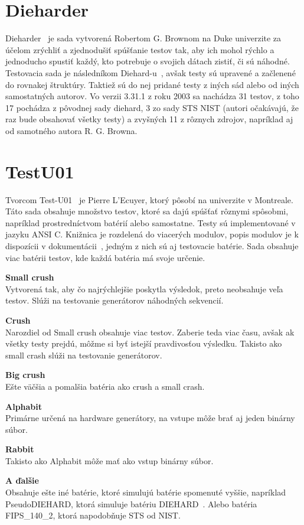 \section{Dieharder}
\label{sec:dieharder}
Dieharder~\parencite{dieharder} je sada vytvorená Robertom G. Brownom na Duke univerzite za účelom zrýchliť a zjednodušiť spúšťanie testov tak, aby ich mohol rýchlo a jednoducho spustiť každý, kto potrebuje o svojich dátach zistiť, či sú náhodné. Testovacia sada je následníkom Diehard-u~\parencite{diehard}, avšak testy sú upravené a začlenené do rovnakej štruktúry. Taktiež sú do nej pridané testy z iných sád alebo od iných samostatných autorov. Vo verzii 3.31.1 z roku 2003 sa nachádza 31 testov, z toho 17 pochádza z pôvodnej sady diehard, 3 zo sady STS NIST (autori očakávajú, že raz bude obsahovať všetky testy) a zvyšných 11 z rôznych zdrojov, napríklad aj od samotného autora R. G. Browna.

\section{TestU01}
\label{sec:testu01}
Tvorcom Test-U01~\parencite{testu01} je  Pierre L’Ecuyer, ktorý pôsobí na univerzite v Montreale. Táto sada obsahuje množstvo testov, ktoré sa dajú spúšťať rôznymi spôsobmi, napríklad prostredníctvom batérií alebo samostatne. Testy sú implementované v jazyku ANSI C. Knižnica je rozdelená do viacerých modulov, popis modulov je k dispozícii v dokumentácii~\parencite{testu01-documentation}, jedným z nich sú aj testovacie batérie. Sada obsahuje viac batérii testov, kde každá batéria má svoje určenie.
\begin{myItemize}
	\item \textbf{Small crush}\\Vytvorená tak, aby čo najrýchlejšie poskytla výsledok, preto neobsahuje veľa testov. Slúži na testovanie generátorov náhodných sekvencií.
	\item \textbf{Crush}\\Narozdiel od Small crush obsahuje viac testov. Zaberie teda viac času, avšak ak všetky testy prejdú, môžme si byť istejší pravdivosťou výsledku. Takisto ako small crash slúži na testovanie generátorov.
	\item \textbf{Big crush}\\Ešte väčšia a pomalšia batéria ako crush a small crash. 
	\item \textbf{Alphabit}\\Primárne určená na hardware generátory, na vstupe môže brať aj jeden binárny súbor.
	\item \textbf{Rabbit}\\Takisto ako Alphabit môže mať ako vstup binárny súbor.
	\item \textbf{A ďalšie}\\Obsahuje ešte iné batérie, ktoré simulujú batérie spomenuté vyššie, napríklad PseudoDIEHARD, ktorá simuluje batériu DIEHARD~\parencite{diehard}. Alebo batéria FIPS\_140\_2, ktorá napodobňuje STS od NIST.	 
\end{myItemize}
